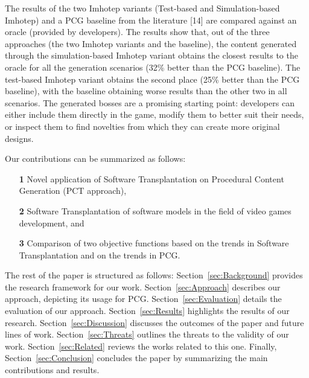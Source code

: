 The results of the two Imhotep variants (Test-based and Simulation-based Imhotep) and a PCG baseline from the literature [14] are compared against an oracle (provided by developers). The results show that, out of the three approaches (the two Imhotep variants and the baseline), the content generated through the simulation-based Imhotep variant obtains the closest results to the oracle for all the generation scenarios (32\% better than the PCG baseline). The test-based Imhotep variant obtains the second place (25\% better than the PCG baseline), with the baseline obtaining worse results than the other two in all scenarios. The generated bosses are a promising starting point: developers can either include them directly in the game, modify them to better suit their needs, or inspect them to find novelties from which they can create more original designs.

Our contributions can be summarized as follows:
\begin{itemize}
    \item[\textbf{1}] Novel application of Software Transplantation on Procedural Content Generation (PCT approach),
    \item[\textbf{2}] Software Transplantation of software models in the field of video games development, and
    \item[\textbf{3}] Comparison of two objective functions based on the trends in Software Transplantation and on the trends in PCG.
\end{itemize}

The rest of the paper is structured as follows: Section~\ref{sec:Background} provides the research framework for our work. Section~\ref{sec:Approach} describes our approach, depicting its usage for PCG. Section~\ref{sec:Evaluation} details the evaluation of our approach. Section~\ref{sec:Results} highlights the results of our research. Section~\ref{sec:Discussion} discusses the outcomes of the paper and future lines of work. Section~\ref{sec:Threats} outlines the threats to the validity of our work. Section~\ref{sec:Related} reviews the works related to this one. Finally, 
Section~\ref{sec:Conclusion} concludes the paper by summarizing the main contributions and results.